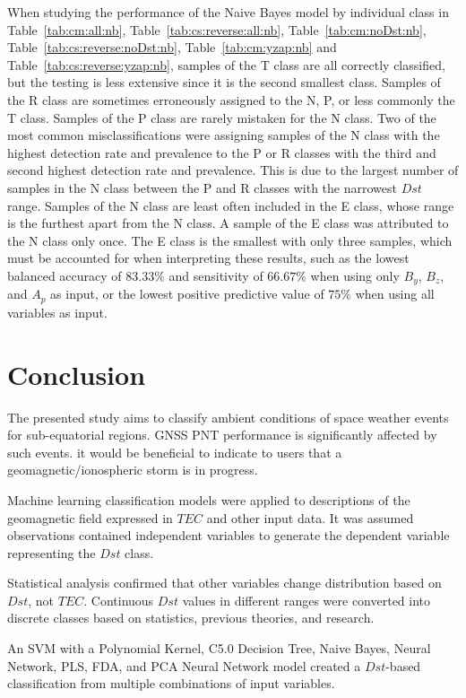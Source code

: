 \documentclass[sn-mathphys-num]{sn-jnl}%
\begin{document}
When studying the performance of the Naive Bayes model by individual class in Table~\ref{tab:cm:all:nb}, Table~\ref{tab:cs:reverse:all:nb}, Table~\ref{tab:cm:noDst:nb}, Table~\ref{tab:cs:reverse:noDst:nb}, Table~\ref{tab:cm:yzap:nb} and Table~\ref{tab:cs:reverse:yzap:nb}, samples of the T class are all correctly classified, but the testing is less extensive since it is the second smallest class. Samples of the R class are sometimes erroneously assigned to the N, P, or less commonly the T class. Samples of the P class are rarely mistaken for the N class. Two of the most common misclassifications were assigning samples of the N class with the highest detection rate and prevalence to the P or R classes with the third and second highest detection rate and prevalence. This is due to the largest number of samples in the N class between the P and R classes with the narrowest $Dst$ range. Samples of the N class are least often included in the E class, whose range is the furthest apart from the N class. A sample of the E class was attributed to the N class only once. The E class is the smallest with only three samples, which must be accounted for when interpreting these results, such as the lowest balanced accuracy of $83.33\%$ and sensitivity of $66.67\%$ when using only $B_{y}$, $B_{z}$, and $A_{p}$ as input, or the lowest positive predictive value of $75\%$ when using all variables as input.

\section{Conclusion}
\label{sec:Conclusion}

The presented study aims to classify ambient conditions of space weather events for sub-equatorial regions. GNSS PNT performance is significantly affected by such events. it would be beneficial to indicate to users that a geomagnetic/ionospheric storm is in progress. 

Machine learning classification models were applied to descriptions of the geomagnetic field expressed in $TEC$ and other input data. It was assumed observations contained independent variables to generate the dependent variable representing the $Dst$ class. 

Statistical analysis confirmed that other variables change distribution based on $Dst$, not $TEC$. Continuous $Dst$ values in different ranges were converted into discrete classes based on statistics, previous theories, and research. 

An SVM with a Polynomial Kernel, C5.0 Decision Tree, Naive Bayes, Neural Network, PLS, FDA, and PCA Neural Network model created a $Dst$-based classification from multiple combinations of input variables.
\end{document}
